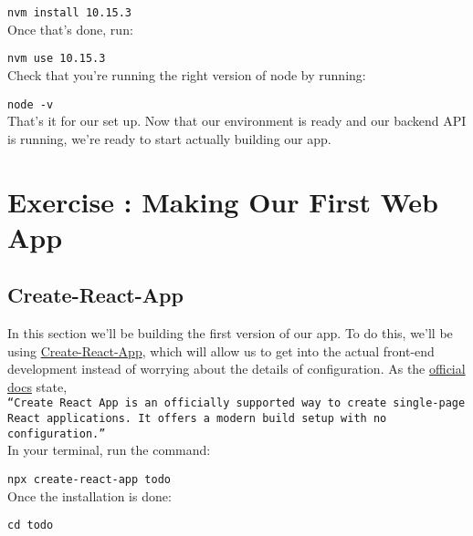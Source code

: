 \documentclass{42-en}
\begin{document}
\texttt{nvm install 10.15.3}\\
\newline
Once that's done, run:

\texttt{nvm use 10.15.3}\\
\newline
Check that you're running the right version of node by running:

\texttt{node -v}\\
\newline
That’s it for our set up. Now that our environment is ready and our backend API is running, we’re ready to start actually building our app.

\startexercices

\chapter{Exercise \exercicenumber: Making Our First Web App}

\section{Create-React-App}

In this section we’ll be building the first version of our app. To do this, we’ll be using \href{https://github.com/facebook/create-react-app}{Create-React-App}, which will allow us to get into the actual front-end development instead of worrying about the details of configuration. As the \href{https://facebook.github.io/create-react-app/docs/getting-started}{official docs} state,\\
\texttt{“Create React App is an officially supported way to create single-page React applications. It offers a modern build setup with no configuration.”}\\
\newline
In your terminal, run the command:

\texttt{npx create-react-app todo}\\
\newline
Once the installation is done:

\texttt{cd todo}
\end{document}
